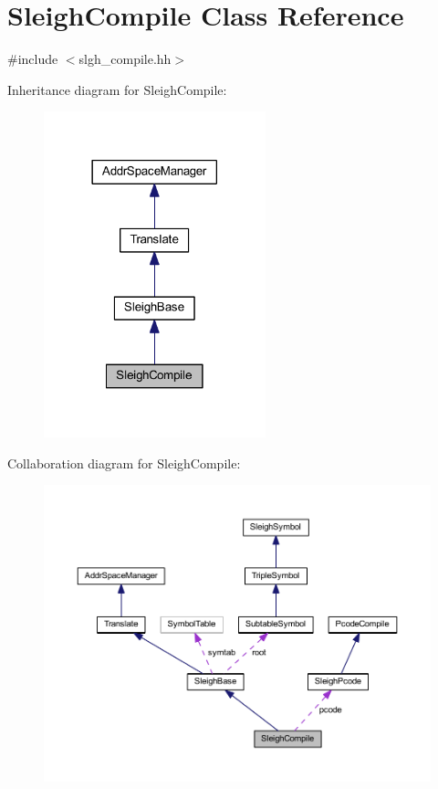 \hypertarget{class_sleigh_compile}{}\section{Sleigh\+Compile Class Reference}
\label{class_sleigh_compile}


{\ttfamily \#include $<$slgh\+\_\+compile.\+hh$>$}



Inheritance diagram for Sleigh\+Compile\+:
\nopagebreak
\begin{figure}[H]
\begin{center}
\leavevmode
\includegraphics[width=182pt]{class_sleigh_compile__inherit__graph}
\end{center}
\end{figure}


Collaboration diagram for Sleigh\+Compile\+:
\nopagebreak
\begin{figure}[H]
\begin{center}
\leavevmode
\includegraphics[width=350pt]{class_sleigh_compile__coll__graph}
\end{center}
\end{figure}

